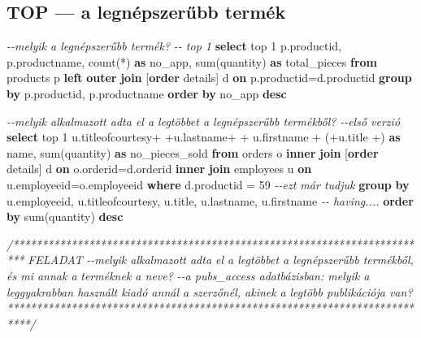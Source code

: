\documentclass[
  magyar,
]{article}
\newenvironment{Shaded}{}{}
\newcommand{\CommentTok}[1]{\textcolor[rgb]{0.38,0.63,0.69}{\textit{#1}}}
\newcommand{\DecValTok}[1]{\textcolor[rgb]{0.25,0.63,0.44}{#1}}
\newcommand{\FunctionTok}[1]{\textcolor[rgb]{0.02,0.16,0.49}{#1}}
\newcommand{\KeywordTok}[1]{\textcolor[rgb]{0.00,0.44,0.13}{\textbf{#1}}}
\newcommand{\NormalTok}[1]{#1}
\newcommand{\OperatorTok}[1]{\textcolor[rgb]{0.40,0.40,0.40}{#1}}
\newcommand{\StringTok}[1]{\textcolor[rgb]{0.25,0.44,0.63}{#1}}
\begin{document}
\subsection{TOP --- a legnépszerűbb
termék}\label{top-a-legnuxe9pszerux171bb-termuxe9k}

\begin{Shaded}
\begin{Highlighting}[]
\CommentTok{{-}{-}melyik a legnépszerűbb termék?}
\CommentTok{{-}{-} top 1}
\KeywordTok{select}\NormalTok{ top }\DecValTok{1}\NormalTok{ p.productid, p.productname, }\FunctionTok{count}\NormalTok{(}\OperatorTok{*}\NormalTok{) }\KeywordTok{as}\NormalTok{ no\_app,}
\FunctionTok{sum}\NormalTok{(quantity) }\KeywordTok{as}\NormalTok{ total\_pieces}
\KeywordTok{from}\NormalTok{ products p }\KeywordTok{left} \KeywordTok{outer} \KeywordTok{join}\NormalTok{ [}\KeywordTok{order}\NormalTok{ details] d }\KeywordTok{on}\NormalTok{ p.productid}\OperatorTok{=}\NormalTok{d.productid}
\KeywordTok{group} \KeywordTok{by}\NormalTok{ p.productid, p.productname}
\KeywordTok{order} \KeywordTok{by}\NormalTok{ no\_app }\KeywordTok{desc}

\CommentTok{{-}{-}melyik alkalmazott adta el a legtöbbet a legnépszerűbb termékből?}
\CommentTok{{-}{-}első verzió}
\KeywordTok{select}\NormalTok{ top }\DecValTok{1}\NormalTok{ u.titleofcourtesy}\OperatorTok{+}\StringTok{\textquotesingle{} \textquotesingle{}}\OperatorTok{+}\NormalTok{u.lastname}\OperatorTok{+}\StringTok{\textquotesingle{} \textquotesingle{}}\OperatorTok{+}\NormalTok{ u.firstname }\OperatorTok{+}\StringTok{\textquotesingle{} (\textquotesingle{}}\OperatorTok{+}\NormalTok{u.title }\OperatorTok{+}\StringTok{\textquotesingle{})\textquotesingle{}} \KeywordTok{as}\NormalTok{ name,}
\FunctionTok{sum}\NormalTok{(quantity) }\KeywordTok{as}\NormalTok{ no\_pieces\_sold}
\KeywordTok{from}\NormalTok{ orders o }\KeywordTok{inner} \KeywordTok{join}\NormalTok{ [}\KeywordTok{order}\NormalTok{ details] d }\KeywordTok{on}\NormalTok{ o.orderid}\OperatorTok{=}\NormalTok{d.orderid}
\KeywordTok{inner} \KeywordTok{join}\NormalTok{ employees u }\KeywordTok{on}\NormalTok{ u.employeeid}\OperatorTok{=}\NormalTok{o.employeeid}
\KeywordTok{where}\NormalTok{ d.productid }\OperatorTok{=} \DecValTok{59} \CommentTok{{-}{-}ezt már tudjuk}
\KeywordTok{group} \KeywordTok{by}\NormalTok{ u.employeeid, u.titleofcourtesy, u.title, u.lastname, u.firstname}
\CommentTok{{-}{-} having....}
\KeywordTok{order} \KeywordTok{by} \FunctionTok{sum}\NormalTok{(quantity) }\KeywordTok{desc}

\CommentTok{/************************************************************************}
\CommentTok{FELADAT}
\CommentTok{{-}{-}melyik alkalmazott adta el a legtöbbet a legnépszerűbb termékből, és mi annak a}
\CommentTok{terméknek a neve?}
\CommentTok{{-}{-}a pubs\_access adatbázisban: melyik a leggyakrabban használt kiadó annál a szerzőnél, akinek}
\CommentTok{a legtöbb publikációja van?}
\CommentTok{**************************************************************************/}
\end{Highlighting}
\end{Shaded}
\end{document}
